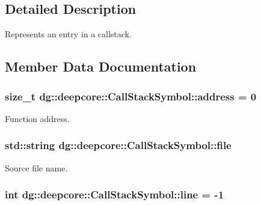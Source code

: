 \subsection{Detailed Description}
Represents an entry in a callstack. 

\subsection{Member Data Documentation}
\subsubsection[{\texorpdfstring{address}{address}}]{\setlength{\rightskip}{0pt plus 5cm}size\+\_\+t dg\+::deepcore\+::\+Call\+Stack\+Symbol\+::address = 0}\hypertarget{structdg_1_1deepcore_1_1_call_stack_symbol_a017a9b54f804965736f2c5fb4ab57893}{}\label{structdg_1_1deepcore_1_1_call_stack_symbol_a017a9b54f804965736f2c5fb4ab57893}


Function address. 

\subsubsection[{\texorpdfstring{file}{file}}]{\setlength{\rightskip}{0pt plus 5cm}std\+::string dg\+::deepcore\+::\+Call\+Stack\+Symbol\+::file}\hypertarget{structdg_1_1deepcore_1_1_call_stack_symbol_a71bdd1fa76748bd2ec9b2259b773a607}{}\label{structdg_1_1deepcore_1_1_call_stack_symbol_a71bdd1fa76748bd2ec9b2259b773a607}


Source file name. 

\subsubsection[{\texorpdfstring{line}{line}}]{\setlength{\rightskip}{0pt plus 5cm}int dg\+::deepcore\+::\+Call\+Stack\+Symbol\+::line = -\/1}\hypertarget{structdg_1_1deepcore_1_1_call_stack_symbol_a3877758a7e10671163f02948abe725d5}{}\label{structdg_1_1deepcore_1_1_call_stack_symbol_a3877758a7e10671163f02948abe725d5}


